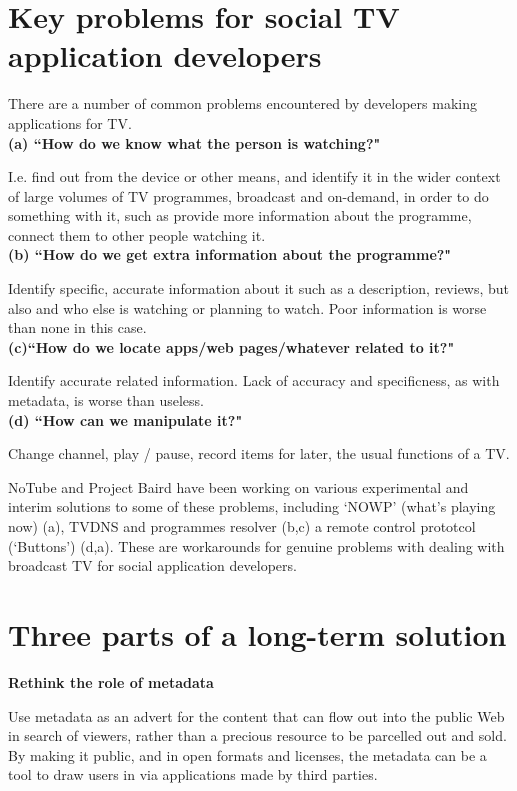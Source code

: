 \documentclass[]{article}%
\begin{document}
\section{Key problems for social TV application developers}

There are a number of common problems encountered by developers making applications for TV.
\\

{\bf{(a) ``How do we know what the person is watching?" }}

I.e. find out from the device or other means, and identify it in the wider context of large volumes of TV programmes, broadcast and on-demand, in order to do something with it, such as provide more information about the programme, connect them to other people watching it.
\\

{\bf{(b) ``How do we get extra information about the programme?" }}

Identify specific, accurate information about it such as a description, reviews,  but also and who else is watching or planning to watch. Poor information is worse than none in this case.
\\

{\bf{(c)``How do we locate apps/web pages/whatever related to it?" }}

Identify accurate related information. Lack of accuracy and specificness, as with metadata, is worse than useless.
\\

{\bf{(d) ``How can we manipulate it?"}}

Change channel, play / pause, record items for later, the usual functions of a TV.

NoTube and Project Baird have been working on various experimental and interim solutions to some of these problems, including  `NOWP' (what's playing now) (a),  TVDNS and programmes resolver (b,c)  a remote control prototcol (`Buttons') (d,a). These are workarounds for genuine problems with dealing with broadcast TV for social application developers. 

\section{Three parts of a long-term solution}

{\bf{Rethink the role of metadata}}

Use metadata as an advert for the content that can flow out into the public Web in search of viewers, rather than a precious resource to be parcelled out and sold. By making it public, and in open formats and licenses, the metadata can be a tool to draw users in via applications made by third parties.
\end{document}

